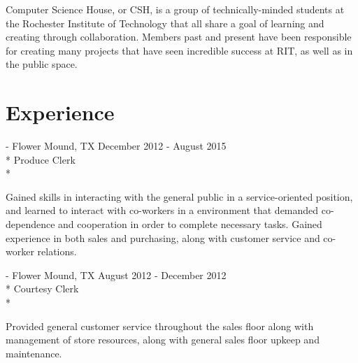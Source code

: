 \documentclass[letter,margin,line]{resume}
\newcommand{\rurl}[1]{\hfill {\footnotesize \url{#1}}}
\newcommand{\rdate}[1]{\hfill {\small #1}}
\renewcommand{\employer}[5]{\item[#1] - #2 \rdate{#3} \\* #4 \rurl{#5} \\*}
\begin{document}
\begin{resume}
\begin{asparablank}
        \small Computer Science House, or CSH, is a group of technically-minded students at the Rochester Institute of Technology that all share a goal of learning and creating through collaboration. Members past and present have been responsible for creating many projects that have seen incredible success at RIT, as well as in the public space.
	\end{asparablank}

\section{\mysidestyle Experience}
	\begin{asparadesc}
		\employer{Sprouts Farmers Market}{Flower Mound, TX}{December 2012 - August 2015}{Produce Clerk}{}

		\small
		Gained skills in interacting with the general public in a service-oriented position, and learned to interact with co-workers in a environment that demanded co-dependence and cooperation in order to complete necessary tasks. Gained experience in both sales and purchasing, along with customer service and co-worker relations.
		\normalsize
		\\
        
        \employer{Kroger Co.}{Flower Mound, TX}{August 2012 - December 2012}{Courtesy Clerk}{}

		\small
		Provided general customer service throughout the sales floor along with management of store resources, along with general sales floor upkeep and maintenance.
		\normalsize
		\\
	\end{asparadesc}

\end{resume}
\end{document}
